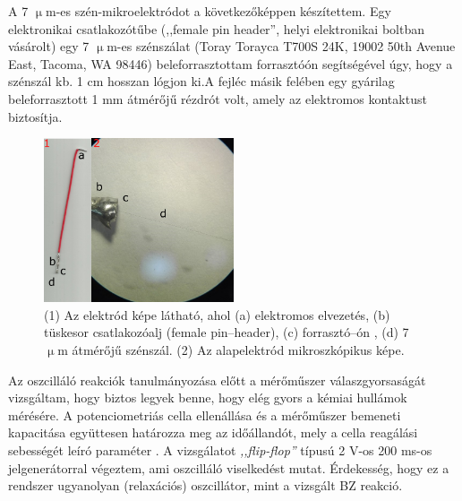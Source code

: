 A 7 $\upmu$m-es szén-mikroelektródot a következőképpen készítettem. Egy elektronikai csatlakozótűbe (,,female pin header'', helyi elektronikai boltban vásárolt) egy 7 $\upmu$m-es szénszálat (Toray Torayca T700S 24K, 19002 50th Avenue East, Tacoma, WA 98446) beleforrasztottam forrasztóón segítségével úgy, hogy a szénszál kb. 1 cm hosszan lógjon ki.A fejléc másik felében egy gyárilag beleforrasztott 1 mm átmérőjű rézdrót volt, amely az elektromos kontaktust biztosítja.
\begin{figure}[h]
\centering
\includegraphics[width=0.5\textwidth]{img/szenmikro.png}
\caption{(1) Az elektród képe látható, ahol (a) elektromos elvezetés, (b) tüskesor csatlakozóalj (female pin--header), (c) forrasztó--ón , (d) 7 $\upmu$m átmérőjű szénszál. (2) Az alapelektród mikroszkópikus képe.}
\label{fig:ionophores}
\end{figure}


Az oszcilláló reakciók tanulmányozása előtt a mérőműszer válaszgyorsaságát vizsgáltam, hogy biztos legyek benne, hogy elég gyors a kémiai hullámok mérésére. A potenciometriás cella ellenállása és a mérőműszer bemeneti kapacitása együttesen határozza meg az időállandót, mely a cella reagálási sebességét leíró paraméter \cite{kiss2015deconvolution}. A vizsgálatot \emph{,,flip-flop''} típusú 2 V-os 200 ms-os jelgenerátorral végeztem, ami oszcilláló viselkedést mutat. Érdekesség, hogy ez a rendszer ugyanolyan (relaxációs) oszcillátor, mint a vizsgált BZ reakció.

